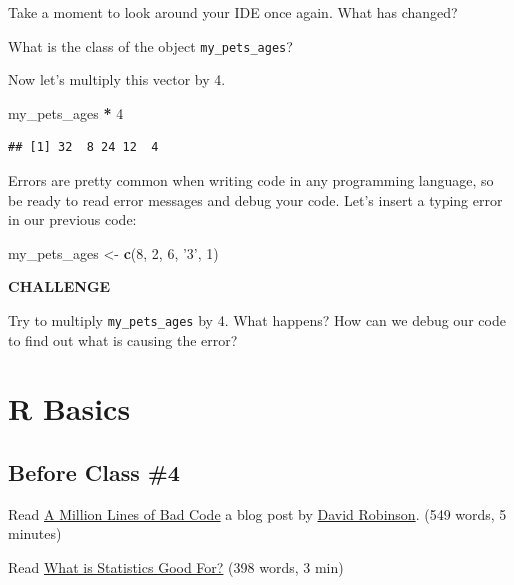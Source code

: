 \documentclass[
]{book}
\newenvironment{Shaded}{\begin{snugshade}}{\end{snugshade}}
\newcommand{\DecValTok}[1]{\textcolor[rgb]{0.00,0.00,0.81}{#1}}
\newcommand{\KeywordTok}[1]{\textcolor[rgb]{0.13,0.29,0.53}{\textbf{#1}}}
\newcommand{\NormalTok}[1]{#1}
\newcommand{\OperatorTok}[1]{\textcolor[rgb]{0.81,0.36,0.00}{\textbf{#1}}}
\newcommand{\StringTok}[1]{\textcolor[rgb]{0.31,0.60,0.02}{#1}}
\begin{document}
Take a moment to look around your IDE once again. What has changed?

What is the class of the object \texttt{my\_pets\_ages}?

Now let's multiply this vector by 4.

\begin{Shaded}
\begin{Highlighting}[]
\NormalTok{my_pets_ages }\OperatorTok{*}\StringTok{ }\DecValTok{4}
\end{Highlighting}
\end{Shaded}

\begin{verbatim}
## [1] 32  8 24 12  4
\end{verbatim}

Errors are pretty common when writing code in any programming language, so be ready to read error messages and debug your code. Let's insert a typing error in our previous code:

\begin{Shaded}
\begin{Highlighting}[]
\NormalTok{my_pets_ages <-}\StringTok{ }\KeywordTok{c}\NormalTok{(}\DecValTok{8}\NormalTok{, }\DecValTok{2}\NormalTok{, }\DecValTok{6}\NormalTok{, }\StringTok{'3'}\NormalTok{, }\DecValTok{1}\NormalTok{)}
\end{Highlighting}
\end{Shaded}

\textbf{CHALLENGE}

Try to multiply \texttt{my\_pets\_ages} by 4. What happens? How can we debug our code to find out what is causing the error?

\hypertarget{r-basics}{%
\chapter{R Basics}\label{r-basics}}

\hypertarget{before-class-4}{%
\section{Before Class \#4}\label{before-class-4}}

Read \href{http://varianceexplained.org/programming/bad-code/}{A Million Lines of Bad Code} a blog post by \href{http://varianceexplained.org/about/}{David Robinson}. (549 words, 5 minutes)

Read \href{readings/module7_eds_whats_stats.pdf}{What is Statistics Good For?} (398 words, 3 min)
\end{document}
